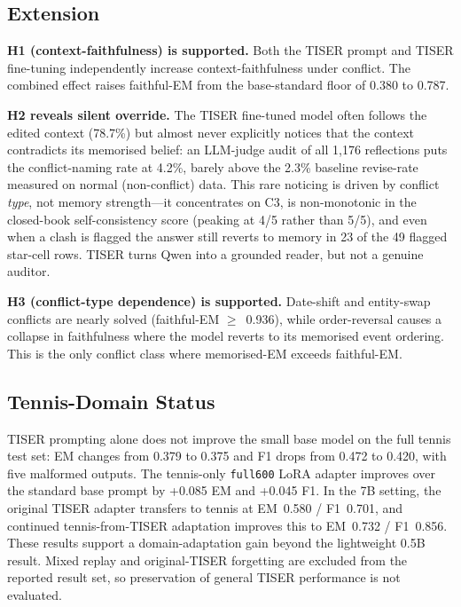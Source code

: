 \documentclass[conference]{IEEEtran}
\begin{document}
\subsection{Extension}

\textbf{H1 (context-faithfulness) is supported.} Both the TISER prompt and TISER fine-tuning independently increase context-faithfulness under conflict. The combined effect raises faithful-EM from the base-standard floor of 0.380 to 0.787.

\textbf{H2 reveals silent override.} The TISER fine-tuned model often follows the edited context (78.7\%) but almost never explicitly notices that the context contradicts its memorised belief: an LLM-judge audit of all 1,176 reflections puts the conflict-naming rate at 4.2\%, barely above the 2.3\% baseline revise-rate measured on normal (non-conflict) data. This rare noticing is driven by conflict \emph{type}, not memory strength---it concentrates on C3, is non-monotonic in the closed-book self-consistency score (peaking at 4/5 rather than 5/5), and even when a clash is flagged the answer still reverts to memory in 23 of the 49 flagged star-cell rows. TISER turns Qwen into a grounded reader, but not a genuine auditor.

\textbf{H3 (conflict-type dependence) is supported.} Date-shift and entity-swap conflicts are nearly solved (faithful-EM $\geq$~0.936), while order-reversal causes a collapse in faithfulness where the model reverts to its memorised event ordering. This is the only conflict class where memorised-EM exceeds faithful-EM.

\subsection{Tennis-Domain Status}

TISER prompting alone does not improve the small base model on the full tennis test set: EM changes from 0.379 to 0.375 and F1 drops from 0.472 to 0.420, with five malformed outputs. The tennis-only \texttt{full600} LoRA adapter improves over the standard base prompt by +0.085 EM and +0.045 F1. In the 7B setting, the original TISER adapter transfers to tennis at EM~0.580 / F1~0.701, and continued tennis-from-TISER adaptation improves this to EM~0.732 / F1~0.856. These results support a domain-adaptation gain beyond the lightweight 0.5B result. Mixed replay and original-TISER forgetting are excluded from the reported result set, so preservation of general TISER performance is not evaluated.
\end{document}
